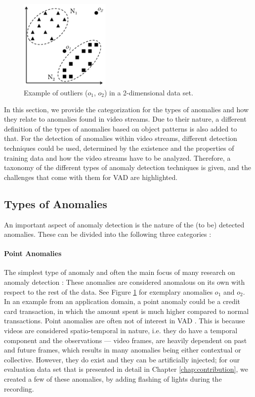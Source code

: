 \begin{figure}
	\centering
	\includegraphics[width=0.39\textwidth]{graphics/anomalyDetection/anomalies/pointAnomaly/pointAnomaly.pdf}
  \caption[Example of outliers in a 2-dimensional data set.]{Example of outliers ($o_1$, $o_2$) in a 2-dimensional data set. \cite{chandola2009anomaly}}
  \label{fig:anomalies}
\end{figure}

In this section, we provide the categorization for the types of anomalies and how they relate to anomalies found in video streams. Due to their nature, a different definition of the types of anomalies based on object patterns is also added to that. For the detection of anomalies within video streams, different detection techniques could be used, determined by the existence and the properties of training data and how the video streams have to be analyzed. Therefore, a taxonomy of the different types of anomaly detection techniques is given, and the challenges that come with them for VAD are highlighted.


\subsection{Types of Anomalies} \label{subsec:anomaly_types}

An important aspect of anomaly detection is the nature of the (to be) detected anomalies. These can be divided into the following three categories \cite{chandola2009anomaly}:

\paragraph{Point Anomalies} \label{par:point_ano}
The simplest type of anomaly and often the main focus of many research on anomaly detection \cite{malik2014comparative}: These anomalies are considered anomalous on its own with respect to the rest of the data. See Figure \ref{fig:anomalies} for exemplary anomalies $o_1$ and $o_2$. In an example from an application domain, a point anomaly could be a credit card transaction, in which the amount spent is much higher compared to normal transactions. Point anomalies are often not of interest in VAD \cite{shin20203d}. This is because videos are considered spatio-temporal in nature, i.e. they do have a temporal component and the observations --- video frames, are heavily dependent on past and future frames, which results in many anomalies being either contextual or collective. However, they do exist and they can be artificially injected; for our evaluation data set that is presented in detail in Chapter \ref{chap:contribution}, we created a few of these anomalies, by adding flashing of lights during the recording.

